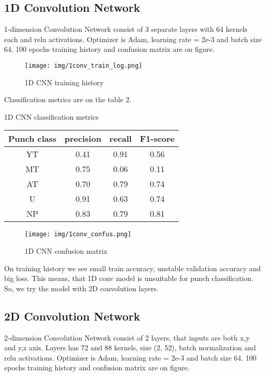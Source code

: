\documentclass[sport,article,submit,moreauthors,pdftex]{Definitions/mdpi}
\begin{document}

\subsection{1D Convolution Network}
1-dimension Convolution Network consist of 3 separate layers with 64 kernels each and relu activations. 
Optimizer is Adam, learning rate = 2e-3 and batch size 64.
100 epochs training history and confusion matrix are on figure.

\begin{figure}[H]
\texttt{[image: img/1conv\_train\_log.png]}
\caption{1D CNN training history}
\end{figure} 

Classification metrics are on the table 2.

\begin{specialtable}[H] 
\caption{1D CNN classification metrics\label{tab2}}
\begin{tabular}{cccc}
\toprule
\textbf{Punch class}	& \textbf{precision}	& \textbf{recall}	& \textbf{F1-score}\\
\midrule
YT		& 0.41		& 0.91		& 0.56 \\
MT		& 0.75		& 0.06		& 0.11 \\
AT		& 0.70		& 0.79		& 0.74 \\
U		& 0.91		& 0.63		& 0.74 \\
NP		& 0.83		& 0.79		& 0.81 \\
\bottomrule
\end{tabular}
\end{specialtable}

\begin{figure}[H]
\texttt{[image: img/1conv\_confus.png]}
\caption{1D CNN confusion matrix}
\end{figure} 

On training history we see small train accuracy, unstable validation accuracy and big loss.
This means, that 1D conv model is unsuitable for punch classification.
So, we try the model with 2D convolution layers.


\subsection{2D Convolution Network}
2-dimension Convolution Network consist of 2 layers, that inputs are both x,y and y,z axis. Layers has  72 and 88 kernels, size (2, 52), batch normalization and relu activations. 
Optimizer is Adam, learning rate = 2e-3 and batch size 64.
100 epochs training history and confusion matrix are on figure.
\end{document}
